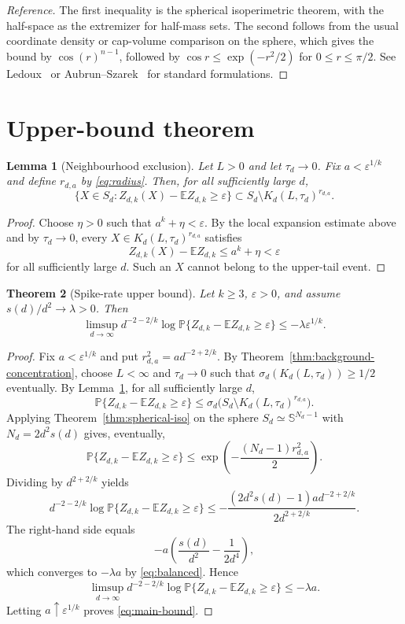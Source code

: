 \documentclass[11pt]{article}
\newtheorem{theorem}{Theorem}[section]
\newtheorem{lemma}[theorem]{Lemma}
\newcommand{\Prob}{\mathbb P}
\newcommand{\E}{\mathbb E}
\newcommand{\Sphere}{\mathbb S}
\newcommand{\eps}{\varepsilon}
\begin{document}
\begin{proof}[Reference]
The first inequality is the spherical isoperimetric theorem, with the half-space as the extremizer for half-mass sets.  The second follows from the usual coordinate density or cap-volume comparison on the sphere, which gives the bound by $\cos(r)^{n-1}$, followed by $\cos r\le \exp(-r^2/2)$ for $0\le r\le \pi/2$.  See Ledoux~\cite[Chapter~1]{Ledoux2001} or Aubrun--Szarek~\cite[Corollary~5.17]{AubrunSzarek2017} for standard formulations.
\end{proof}

\section{Upper-bound theorem}

\begin{lemma}[Neighbourhood exclusion]\label{lem:neighbourhood-exclusion}
Let \(L>0\) and let \(\tau_d\to0\).  Fix
$a<\eps^{1/k}$ and define \(r_{d,a}\) by \eqref{eq:radius}.  Then, for all
sufficiently large $d$,
\[
  \{X\in S_d:Z_{d,k}(X)-\E Z_{d,k}\ge \eps\}
  \subset S_d\setminus K_d(L,\tau_d)^{r_{d,a}}.
\]
\end{lemma}

\begin{proof}
Choose \(\eta>0\) such that \(a^k+\eta<\eps\).  By the local expansion estimate
above and by \(\tau_d\to0\), every \(X\in K_d(L,\tau_d)^{r_{d,a}}\)
satisfies
\[
  Z_{d,k}(X)-\E Z_{d,k}\le a^k+\eta<\eps
\]
for all sufficiently large \(d\).  Such an \(X\) cannot belong to the upper-tail
event.
\end{proof}

\begin{theorem}[Spike-rate upper bound]\label{thm:main}
Let $k\ge 3$, $\eps>0$, and assume $s(d)/d^2\to\lambda>0$.  Then
\begin{equation}\label{eq:main-bound}
  \limsup_{d\to\infty}d^{-2-2/k}\log \Prob\{Z_{d,k}-\E Z_{d,k}\ge \eps\}
  \le -\lambda\eps^{1/k} .
\end{equation}
\end{theorem}

\begin{proof}
Fix $a<\eps^{1/k}$ and put $r_{d,a}^2=a d^{-2+2/k}$.  By
Theorem~\ref{thm:background-concentration}, choose \(L<\infty\) and
\(\tau_d\to0\) such that \(\sigma_d(K_d(L,\tau_d))\ge1/2\) eventually.  By
Lemma~\ref{lem:neighbourhood-exclusion}, for all sufficiently large $d$,
\[
  \Prob\{Z_{d,k}-\E Z_{d,k}\ge \eps\}
  \le \sigma_d\bigl(S_d\setminus K_d(L,\tau_d)^{r_{d,a}}\bigr).
\]
Applying
Theorem~\ref{thm:spherical-iso} on the sphere
$S_d\simeq \Sphere^{N_d-1}$ with $N_d=2d^2s(d)$ gives, eventually,
\[
  \Prob\{Z_{d,k}-\E Z_{d,k}\ge \eps\}
  \le \exp\left(-\frac{(N_d-1)r_{d,a}^2}{2}\right).
\]
Dividing by $d^{2+2/k}$ yields
\[
  d^{-2-2/k}\log \Prob\{Z_{d,k}-\E Z_{d,k}\ge \eps\}
  \le
  -\frac{(2d^2s(d)-1)a d^{-2+2/k}}{2d^{2+2/k}}.
\]
The right-hand side equals
\[
  -a\left(\frac{s(d)}{d^2}-\frac{1}{2d^4}\right),
\]
which converges to $-\lambda a$ by \eqref{eq:balanced}.  Hence
\[
  \limsup_{d\to\infty}d^{-2-2/k}\log \Prob\{Z_{d,k}-\E Z_{d,k}\ge \eps\}
  \le -\lambda a .
\]
Letting $a\uparrow \eps^{1/k}$ proves \eqref{eq:main-bound}.
\end{proof}
\end{document}
